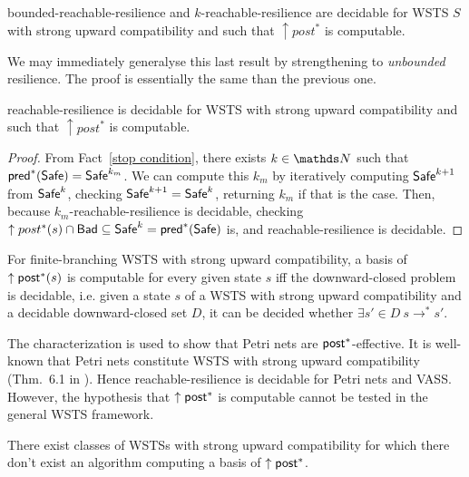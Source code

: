 \begin{theorem}\cite{DBLP:conf/gg/Ozkan22,DBLP:journals/corr/abs-2108-00889}
{\sc bounded-reachable-resilience} and {\sc $k$-reachable-resilience} are decidable for WSTS $S$ with strong upward compatibility and such that $\uparrow post^*$ is computable.
\end{theorem}

We may immediately generalyse this last result by strengthening to \emph{unbounded} resilience. The proof is essentially the same than the previous one.

\begin{corollary}\label{postcomputable}
{\sc reachable-resilience} is decidable for WSTS with strong upward compatibility and such that $\uparrow post^*$ is computable.
\end{corollary}


\begin{proof}
From Fact~\ref{stop condition}, there exists $k \in \N$ such that
$\textsf{pred}^*(\textsf{Safe}) =  \textsf{Safe}^{k_m}$. We can compute this $k_m$ by iteratively computing
$\textsf{Safe}^{k+1}$ from $\textsf{Safe}^k$, checking $\textsf{Safe}^{k+1}=\textsf{Safe}^k$, 
returning $k_m$ if that is the case.
Then, because $k_m$-reachable-resilience is decidable, 
checking $\uparrow post^*(s) \cap \textsf{Bad} \subseteq \textsf{Safe}^k = \textsf{pred}^*(\textsf{Safe})$ is,
and reachable-resilience is decidable.
\end{proof}

\begin{proposition}
For finite-branching WSTS with strong upward compatibility, a basis of $\uparrow \textsf{post}^*(s)$ is computable for every given state $s$ iff the downward-closed problem is decidable, i.e. given a state $s$ of a WSTS
with strong upward compatibility 
and a decidable downward-closed set $D$, it can be decided whether $\exists s' \in D ~ s \to^* s'$. 
\end{proposition}

The characterization is used to show that Petri nets are $\textsf{post}^*$-effective. It is well-known that Petri nets constitute WSTS with strong upward compatibility (Thm.~6.1 in \cite{DBLP:journals/tcs/FinkelS01}). Hence reachable-resilience is decidable for Petri nets and VASS.
However, the hypothesis that $\uparrow \textsf{post}^*$ is computable cannot be tested in the general WSTS framework.

\begin{proposition}
There exist classes of WSTSs with strong upward compatibility for which there don't exist an algorithm computing a basis of $\uparrow \textsf{post}^*$.
\end{proposition}


